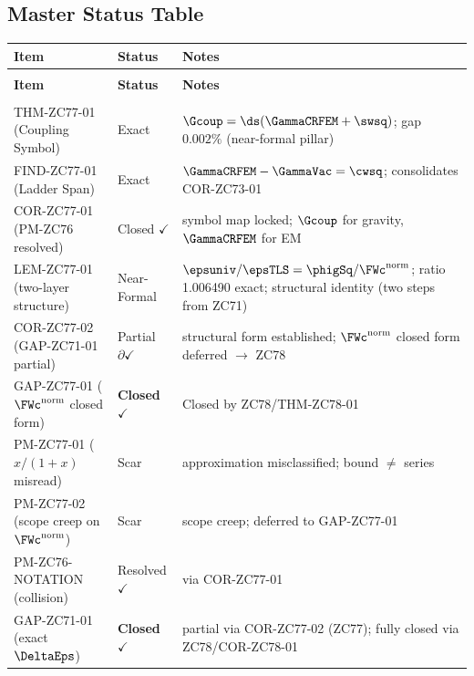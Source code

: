 \documentclass[12pt, a4paper]{article}
\begin{document}
\subsection{Master Status Table}
\label{sec:status}

{\small
\setlength{\LTpre}{4pt}\setlength{\LTpost}{4pt}
\renewcommand{\arraystretch}{1.30}
\begin{longtable}{>{\raggedright\arraybackslash}p{5.0cm}
                  >{\centering\arraybackslash}p{2.4cm}
                  >{\raggedright\arraybackslash}p{5.2cm}}
\toprule
\textbf{Item} & \textbf{Status} & \textbf{Notes} \\
\midrule
\endfirsthead
\multicolumn{3}{l}{\small\textit{(continued)}}\\[4pt]
\toprule\textbf{Item}&\textbf{Status}&\textbf{Notes}\\\midrule
\endhead
\midrule\multicolumn{3}{r}{\small\textit{(continues)}}\\
\endfoot
\bottomrule
\endlastfoot
THM-ZC77-01 (Coupling Symbol)
  & Exact & $\Gcoup=\ds(\GammaCRFEM+\swsq)$; gap $0.002\%$
    (near-formal pillar) \\[4pt]
FIND-ZC77-01 (Ladder Span)
  & Exact & $\GammaCRFEM - \GammaVac = \cwsq$;
    consolidates COR-ZC73-01 \\[4pt]
COR-ZC77-01 (PM-ZC76 resolved)
  & Closed $\checkmark$ & symbol map locked;
    $\Gcoup$ for gravity, $\GammaCRFEM$ for EM \\[4pt]
LEM-ZC77-01 (two-layer structure)
  & Near-Formal & $\epsuniv/\epsTLS = \phigSq/\FWc^{\rm norm}$;
    ratio 1.006490 exact; structural identity (two steps from ZC71) \\[4pt]
COR-ZC77-02 (GAP-ZC71-01 partial)
  & Partial $\partial\checkmark$ & structural form established;
    $\FWc^{\rm norm}$ closed form deferred $\to$ ZC78 \\[4pt]
GAP-ZC77-01 ($\FWc^{\rm norm}$ closed form)
  & \textbf{Closed} $\checkmark$ & Closed by ZC78/THM-ZC78-01 \\[4pt]
PM-ZC77-01 ($x/(1+x)$ misread)
  & Scar & approximation misclassified; bound $\neq$ series \\[4pt]
PM-ZC77-02 (scope creep on $\FWc^{\rm norm}$)
  & Scar & scope creep; deferred to GAP-ZC77-01 \\[4pt]
\midrule
PM-ZC76-NOTATION (collision)
  & Resolved $\checkmark$ & via COR-ZC77-01 \\[4pt]
GAP-ZC71-01 (exact $\DeltaEps$)
  & \textbf{Closed} $\checkmark$ & partial via COR-ZC77-02 (ZC77);
    fully closed via ZC78/COR-ZC78-01 \\
\bottomrule
\end{longtable}
}
\end{document}
